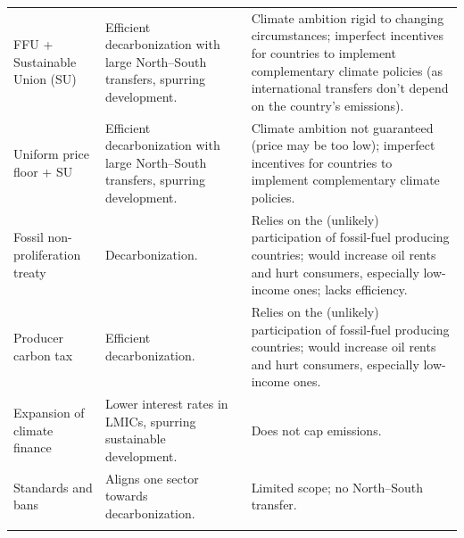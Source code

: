 \documentclass[12pt,english]{article}
\begin{document}
\begin{table}[h]
{\begin{tabular}[t]{P{4cm}P{8cm}P{8cm}}
  FFU + Sustainable Union (SU)  & Efficient decarbonization with large North--South transfers, spurring development. & Climate ambition rigid to changing circumstances; imperfect incentives for countries to implement complementary climate policies (as international transfers don't depend on the country's emissions). \\
  Uniform price floor + SU  & Efficient decarbonization with large North--South transfers, spurring development.  & Climate ambition not guaranteed (price may be too low); imperfect incentives for countries to implement complementary climate policies. \\
  Fossil non-proliferation treaty  & Decarbonization. & Relies on the (unlikely) participation of fossil-fuel producing countries; would increase oil rents and hurt consumers, especially low-income ones; lacks efficiency. \\
  Producer carbon tax  & Efficient decarbonization. & Relies on the (unlikely) participation of fossil-fuel producing countries; would increase oil rents and hurt consumers, especially low-income ones. \\
  Expansion of climate finance  & Lower interest rates in LMICs, spurring sustainable development. & Does not cap emissions. \\
  Standards and bans  & Aligns one sector towards decarbonization. & Limited scope; no North--South transfer. \\
  \bottomrule\\[-0.81em]
\end{tabular}}
\end{table}
\end{document}
